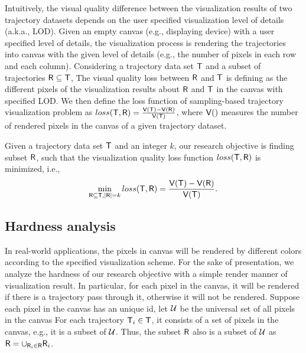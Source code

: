 Intuitively, the visual quality difference between the visualization results of two trajectory datasets depends on the user specified visualization level of details (a.k.a., LOD).
Given an empty canvas (e.g., displaying device) with a user specified level of details, 
the visualization process is rendering the trajectories into canvas with the given level of details (e.g., the number of pixels in each row and each column).
Considering a trajectory data set $\mathsf{T}$ and a subset of trajectories $\mathsf{R} \subseteq \mathsf{T}$,
The visual quality loss between $\mathsf{R}$ and $\mathsf{T}$ is defining as the different pixels of the visualization results about $\mathsf{R}$ and $\mathsf{T}$ in the canvas with specified LOD.
We then define the loss function of sampling-based trajectory visualization problem as $loss(\mathsf{T}, \mathsf{R}) = \frac{\mathsf{V}(\mathsf{T}) - \mathsf{V}(\mathsf{R})}{\mathsf{V}(\mathsf{T})}$,
where $\mathsf{V}()$ measures the number of rendered pixels in the canvas of a given trajectory dataset.

Given a trajectory data set $\mathsf{T}$ and an integer $k$,  our research objective is finding subset $\mathsf{R}$, such that  the visualization quality loss function $loss(\mathsf{T}, \mathsf{R})$ is minimized,
i.e.,
$$ \min_{\mathsf{R} \subseteq \mathsf{T}, |\mathsf{R}| = k}  loss(\mathsf{T}, \mathsf{R}) =  \frac{\mathsf{V}(\mathsf{T}) - \mathsf{V}(\mathsf{R})}{\mathsf{V}(\mathsf{T})}. $$ %






\subsection{Hardness analysis}
In real-world applications, the pixels in canvas will be rendered by different colors according to the specified visualization scheme.
For the sake of presentation, we analyze the hardness of our research objective with a simple render manner of visualization result.
In particular, for each pixel in the canvas, it will be rendered if there is a trajectory pass through it, otherwise it will not be rendered.
Suppose each pixel in the canvas has an unique id, let $\mathcal{U}$ be the universal set of all pixels in the canvas
For each trajectory $\mathsf{T}_i \in \mathsf{T}$, it consists of a set of pixels in the canvas, e.g., it is a subset of $\mathcal{U}$.
Thus, the subset $\mathsf{R}$ also is a subset of $\mathcal{U}$ as $\mathsf{R} = \cup_{\mathsf{R}_i \in \mathsf{R}} \mathsf{R}_i$.

